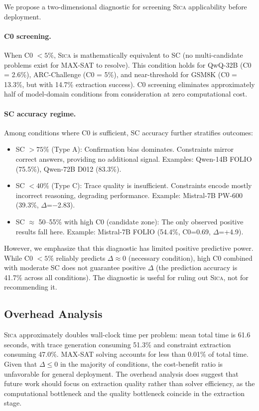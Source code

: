 \documentclass[11pt,a4paper]{article}
\newcommand{\sica}{\textsc{Sica}}
\newcommand{\pp}{\text{pp}}
\begin{document}
We propose a two-dimensional diagnostic for screening \sica{} applicability before deployment.

\paragraph{C0 screening.}
When C0 $< 5\%$, \sica{} is mathematically equivalent to SC (no multi-candidate problems exist for MAX-SAT to resolve).
This condition holds for QwQ-32B (C0 = 2.6\%), ARC-Challenge (C0 = 5\%), and near-threshold for GSM8K (C0 = 13.3\%, but with 14.7\% extraction success).
C0 screening eliminates approximately half of model-domain conditions from consideration at zero computational cost.

\paragraph{SC accuracy regime.}
Among conditions where C0 is sufficient, SC accuracy further stratifies outcomes:
\begin{itemize}
\item SC $> 75\%$ (Type A): Confirmation bias dominates. Constraints mirror correct answers, providing no additional signal. Examples: Qwen-14B FOLIO (75.5\%), Qwen-72B D012 (83.3\%).
\item SC $< 40\%$ (Type C): Trace quality is insufficient. Constraints encode mostly incorrect reasoning, degrading performance. Example: Mistral-7B PW-600 (39.3\%, $\Delta$=$-$2.83\pp{}).
\item SC $\approx$ 50--55\% with high C0 (candidate zone): The only observed positive results fall here. Example: Mistral-7B FOLIO (54.4\%, C0=0.69, $\Delta$=+4.9\pp{}).
\end{itemize}

However, we emphasize that this diagnostic has limited positive predictive power.
While C0 $< 5\%$ reliably predicts $\Delta \approx 0$ (necessary condition), high C0 combined with moderate SC does not guarantee positive $\Delta$ (the prediction accuracy is 41.7\% across all conditions).
The diagnostic is useful for ruling out \sica{}, not for recommending it.

\subsection{Overhead Analysis}

\sica{} approximately doubles wall-clock time per problem: mean total time is 61.6 seconds, with trace generation consuming 51.3\% and constraint extraction consuming 47.0\%.
MAX-SAT solving accounts for less than 0.01\% of total time.
Given that $\Delta \leq 0$ in the majority of conditions, the cost-benefit ratio is unfavorable for general deployment.
The overhead analysis does suggest that future work should focus on extraction quality rather than solver efficiency, as the computational bottleneck and the quality bottleneck coincide in the extraction stage.
\end{document}
